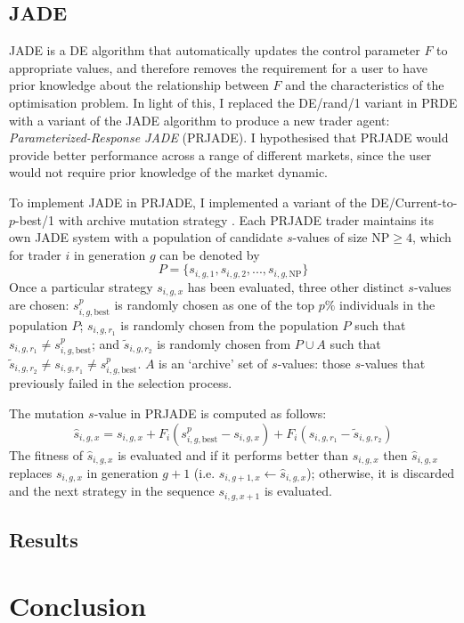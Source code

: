 \documentclass[conference]{IEEEtran}
\begin{document}
\subsection{JADE}

JADE \cite{ZhangSanderson} is a DE algorithm that automatically updates the control parameter $F$ to appropriate values, and therefore removes the requirement for a user to have prior knowledge about the relationship between $F$ and the characteristics of the optimisation problem.
In light of this, I replaced the DE/rand/1 variant in PRDE with a variant of the JADE algorithm to produce a new trader agent: \textit{Parameterized-Response JADE} (PRJADE).
I hypothesised that PRJADE would provide better performance across a range of different markets, since the user would not require prior knowledge of the market dynamic.

To implement JADE in PRJADE, I implemented a variant of the DE/Current-to-$p$-best/1 with archive mutation strategy \cite{ZhangSanderson}.
Each PRJADE trader maintains its own JADE system with a population of candidate $s$-values of size $\mathrm{NP}\ge 4$, which for trader $i$ in generation $g$ can be denoted by 
\[
    P=\{s_{i,g,1}, s_{i,g,2},...,s_{i,g,\mathrm{NP}}\}
\]
Once a particular strategy $s_{i,g,x}$ has been evaluated, three other distinct $s$-values are chosen: $s^p_{i,g,\text{best}}$ is randomly chosen as one of the top $p\%$ individuals in the population $P$; $s_{i,g,r_1}$ is randomly chosen from the population $P$ such that $s_{i,g,r_1}\ne s^p_{i,g,\text{best}}$; and $\tilde{s}_{i,g,r_2}$ is randomly chosen from $P\cup A$ such that $\tilde{s}_{i,g,r_2}\ne s_{i,g,r_1}\ne s^p_{i,g,\text{best}}$.
$A$ is an `archive' set of $s$-values: those $s$-values that previously failed in the selection process.

The mutation $s$-value in PRJADE is computed as follows:
\[
    \hat{s}_{i,g,x}=s_{i,g,x}+F_i\left(s^p_{i,g,\text{best}} - s_{i,g,x}\right) + F_i\left(s_{i,g,r_1} - \tilde{s}_{i,g,r_2}\right)
\]
The fitness of $\hat{s}_{i,g,x}$ is evaluated and if it performs better than $s_{i,g,x}$ then $\hat{s}_{i,g,x}$ replaces $s_{i,g,x}$ in generation $g+1$ (i.e. $s_{i,g+1,x}\leftarrow\hat{s}_{i,g,x}$); otherwise, it is discarded and the next strategy in the sequence $s_{i,g,x+1}$ is evaluated.

\subsection{Results}

\section{Conclusion}



\end{document}
